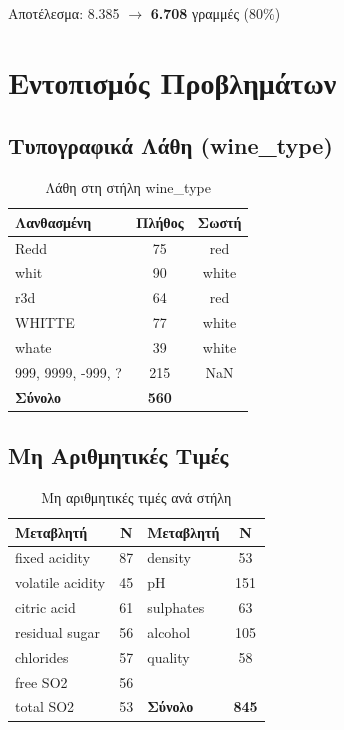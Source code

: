 \documentclass[12pt,a4paper]{article}
\begin{document}
\textgreek{Αποτέλεσμα:} 8.385 $\rightarrow$ \textbf{6.708} \textgreek{γραμμές (80\%)}

\section{\textgreek{Εντοπισμός Προβλημάτων}}

\subsection{\textgreek{Τυπογραφικά Λάθη (wine\_type)}}

\begin{table}[H]
\centering
\caption{\textgreek{Λάθη στη στήλη wine\_type}}
\begin{tabular}{lcc}
\toprule
\textbf{\textgreek{Λανθασμένη}} & \textbf{\textgreek{Πλήθος}} & \textbf{\textgreek{Σωστή}} \\
\midrule
Redd  & 75 & red \\
whit & 90 & white \\
r3d & 64 & red \\
WHITTE & 77 & white \\
whate & 39 & white \\
999, 9999, -999, ? & 215 & NaN \\
\midrule
\textbf{\textgreek{Σύνολο}} & \textbf{560} & \\
\bottomrule
\end{tabular}
\end{table}

\subsection{\textgreek{Μη Αριθμητικές Τιμές}}

\begin{table}[H]
\centering
\caption{\textgreek{Μη αριθμητικές τιμές ανά στήλη}}
\begin{tabular}{lc|lc}
\toprule
\textbf{\textgreek{Μεταβλητή}} & \textbf{N} & \textbf{\textgreek{Μεταβλητή}} & \textbf{N} \\
\midrule
fixed acidity & 87 & density & 53 \\
volatile acidity & 45 & pH & 151 \\
citric acid & 61 & sulphates & 63 \\
residual sugar & 56 & alcohol & 105 \\
chlorides & 57 & quality & 58 \\
free SO2 & 56 & & \\
total SO2 & 53 & \textbf{\textgreek{Σύνολο}} & \textbf{845} \\
\bottomrule
\end{tabular}
\end{table}
\end{document}
